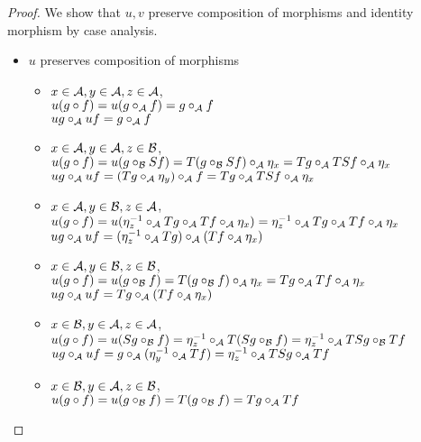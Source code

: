 \documentclass[12pt]{article}
\theoremstyle{plain}
\theoremstyle{definition}
\begin{document}
\begin{proof} We show that $u,v$ preserve composition of morphisms and identity morphism by case analysis.
\begin{itemize}
\item $u$ preserves composition of morphisms
 \begin{itemize}
 \item $x \in {\cal A}, y \in {\cal A}, z \in {\cal A}$, \\
 $u(g \circ f) = u(g \circ_{{\cal A}} f) = g \circ_{{\cal A}} f$ \\
$ug \circ_{{\cal A}} uf = g \circ_{{\cal A}} f$ 
 \item $x \in {\cal A}, y \in {\cal A}, z \in {\cal B}$, \\
 $u(g \circ f) = u(g \circ_{{\cal B}} Sf) = T(g \circ_{{\cal B}} Sf) \circ_{{\cal A}} \eta_{x}=Tg \circ_{{\cal A}} TSf \circ_{{\cal A}} \eta_{x}$ \\
$ug \circ_{{\cal A}} uf =(Tg \circ_{{\cal A}} \eta_{y}) \circ_{{\cal A}} f = Tg \circ_{\cal A} TSf \circ_{{\cal A}} \eta_{x}$ 
 \item $x \in {\cal A}, y \in {\cal B}, z \in {\cal A}$, \\
 $u(g \circ f) =u(\eta_{z}^{-1} \circ_{{\cal A}} Tg \circ_{{\cal A}} Tf \circ_{{\cal A}} \eta_{x})=\eta_{z}^{-1} \circ_{{\cal A}} Tg \circ_{{\cal A}} Tf \circ_{{\cal A}} \eta_{x}$ \\
$ug \circ_{{\cal A}} uf=(\eta_{z}^{-1} \circ_{{\cal A}} Tg) \circ_{{\cal A}} (Tf \circ_{{\cal A}} \eta_{x})$ 
 \item $x \in {\cal A}, y \in {\cal B}, z \in {\cal B}$, \\
 $u(g \circ f) = u(g \circ_{{\cal B}} f)=T(g \circ_{{\cal B}} f) \circ_{{\cal A}} \eta_{x}=Tg \circ_{{\cal A}} Tf \circ_{{\cal A}} \eta_{x}$ \\
$ug \circ_{{\cal A}} uf = Tg \circ_{{\cal A}} (Tf \circ_{{\cal A}} \eta_{x})$
 \item $x \in {\cal B}, y \in {\cal A}, z \in {\cal A}$, \\
$u(g \circ f) = u(Sg \circ_{{\cal B}} f) = \eta_{z}^{-1} \circ_{{\cal A}} T(Sg \circ_{{\cal B}} f) = \eta_{z}^{-1} \circ_{{\cal A}} TSg \circ_{{\cal B}} Tf$ \\
$ug \circ_{{\cal A}} uf = g \circ_{{\cal A}} (\eta_{y}^{-1} \circ_{{\cal A}} Tf) = \eta_{z}^{-1} \circ_{{\cal A}} TSg \circ_{\cal A} Tf$
 \item $ x \in {\cal B}, y \in {\cal A}, z \in {\cal B}$, \\
 $u(g \circ f) = u(g \circ_{{\cal B}} f) = T(g \circ_{{\cal B}} f) = Tg \circ_{{\cal A}} Tf$ \\

\end{itemize}
\end{itemize}
\end{proof}
\end{document}
